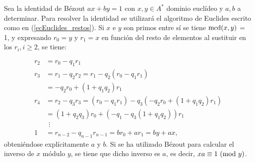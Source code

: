 \begin{prop}\end{prop}

\begin{dem}{\cite[p.~53]{GamboaAnillos}}
    Sea la identidad de Bézout $ax + by = 1$ con $x,y\in A^*$ dominio euclídeo y $a,b$ a determinar. Para resolver la identidad se utilizará el algoritmo de Euclides escrito como en (\ref{ecEuclides_restos}). Si $x$ e $y$ son primos entre sí se tiene $\text{mcd}(x,y)$ = 1, y expresando $r_0 = y$ y $r_1 = x$ en función del resto de elementos al sustituir en los $r_i, i\geq2$, se tiene:
    
        \begin{equation}
            \begin{aligned}
                r_2 &= r_0 - q_1r_1 \\
                r_3 &= r_1 - q_2r_2 = r_1 -q_2(r_0 - q_1r_1) \\
                &=-q_2r_0 + (1+q_1q_2)r_1\\
                r_4 &= r_2 - q_3r_3 = (r_0 - q_1r_1) - q_3(-q_2r_0 + (1+q_1q_2)r_1) \\
                &=(1+q_2q_3)r_0 +(-q_1-q_3(1+q_1q_2))r_1 \\
                &\ \ \vdots \\
                1 &= r_{n-2}- q_{n-1}r_{n-1} = b r_0 + a r_1 = by + ax,
            \end{aligned}
            \tag{**}
            \label{ec:EuclidesExtendidoBezout}
        \end{equation} 
        obteniéndose explícitamente $a$ y $b$. Si se ha utilizado Bézout para calcular el inverso de $x$ módulo $y$, se tiene que dicho inverso es $a$, es decir, $xa \equiv 1 \text{ (mod }y)$.
\end{dem}

